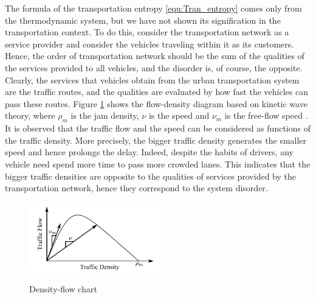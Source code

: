 \documentclass[preprint,authoryear,12pt]{elsarticle}
\begin{document}

The formula of the transportation entropy \eqref{equ:Tran_entropy} comes only from the thermodynamic system, but we have not shown its signification in the transportation context. To do this, consider the transportation network as a service provider and consider the vehicles traveling within it as its customers. Hence, the order of transportation network should be the sum of the qualities of the services provided to all vehicles, and the disorder is, of course, the opposite. Clearly, the services that vehicles obtain from the urban transportation system are the traffic routes, and the qualities are evaluated by how fast the vehicles can pass these routes. Figure \ref{fig:d_q} shows the flow-density diagram based on kinetic wave theory, where $\rho_m$ is the jam density, $\nu$ is the speed and $\nu_m$ is the free-flow speed \citep{ukkusuri_robust_2010}. It is observed that the traffic flow and the speed can be considered as functions of the traffic density. More precisely, the bigger traffic density generates 
the smaller speed and hence prolongs the delay. Indeed, despite the habits of drivers, any vehicle need spend more time to pass more crowded lanes. This indicates that the bigger traffic densities are opposite to the qualities of services provided by the transportation network, hence they correspond to the system disorder.

\begin{figure}[ht]
  \centering
  \includegraphics[height=3cm]{pics/d-q}\\
  \caption{Density-flow chart}
  \label{fig:d_q}
\end{figure}
\end{document}
